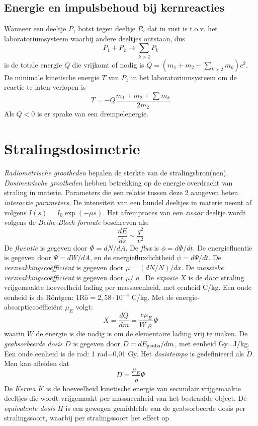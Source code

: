 \subsection{Energie en impulsbehoud bij kernreacties}
Wanneer een deeltje $P_1$ botst tegen deeltje $P_2$ dat in rust is t.o.v. het
laboratoriumsysteem waarbij andere deeltjes ontstaan, dus
\[
P_1+P_2\rightarrow\sum_{k>2} P_k
\]
is de totale energie $Q$ die vrijkomt of nodig is
$Q=(m_1+m_2-\sum\limits_{k>2}m_k)c^2$.
\npar
De minimale kinetische energie $T$ van $P_1$ in het laboratoriumsysteem om de
reactie te laten verlopen is
\[
T=-Q\frac{m_1+m_2+\sum m_k}{2m_2}
\]
Als $Q<0$ is er sprake van een drempelenergie.

\section{Stralingsdosimetrie}
{\it Radiometrische grootheden} bepalen de sterkte van de stralingsbron(nen).
{\it Dosimetrische grootheden} hebben betrekking op de energie overdracht van
straling in materie. Parameters die een relatie tussen deze 2 aangeven heten
{\it interactie parameters}. De intensiteit van een bundel deeltjes in materie
neemt af volgens $I(s)=I_0\exp(-\mu s)$. Het afremproces van een {\it zwaar}
deeltje wordt volgens de {\it Bethe-Bloch formule} beschreven als:
\[
\frac{dE}{ds}\sim\frac{q^2}{v^2}
\]
De {\it fluentie} is gegeven door $\Phi=dN/dA$. De {\it flux} is
$\phi=d\Phi/dt$. De energiefluentie is gegeven door $\Psi=dW/dA$, en de
energiefluxdichtheid $\psi=d\Psi/dt$. De {\it verzwakkingsco\"effici\"ent} is
gegeven door $\mu=(dN/N)/dx$. De {\it massieke verzwakkingsco\"effici\"ent}
is gegeven door $\mu/\varrho$.
\npar
De {\it exposie} $X$ is de door straling vrijgemaakte hoeveelheid lading per
massaeenheid, met eenheid C/kg. Een oude eenheid is de R\"ontgen:
1R\"o$=2,58\cdot10^{-4}$ C/kg. Met de energie-absorptieco\"effici\"ent
$\mu_E$ volgt:
\[
X=\frac{dQ}{dm}=\frac{e\mu_E}{W\varrho}\Psi
\]
waarin $W$ de energie is die nodig is om de elementaire lading vrij te maken.
\npar
De {\it geabsorbeerde dosis} $D$ is gegeven door $D=dE_{\rm geabs}/dm$, met
eenheid Gy=J/kg. Een oude eenheid is de rad: 1 rad=0,01 Gy. Het
{\it dosistempo} is gedefinieerd als $\dot{D}$. Men kan afleiden dat
\[
D=\frac{\mu_E}{\varrho}\Psi
\]
De {\it Kerma} $K$ is de hoeveelheid kinetische energie van secundair
vrijgemaakte deeltjes die wordt vrijgemaakt per massaeenheid van het
bestraalde object.
\npar
De {\it equivalente dosis} $H$ is een gewogen gemiddelde van de geabsorbeerde
dosis per stralingssoort, waarbij per stralingssoort het effect op
